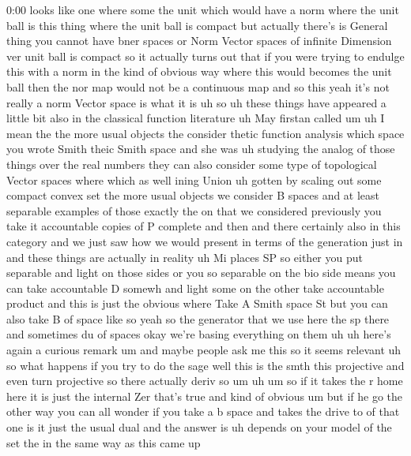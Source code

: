 \begin{unfinished}{0:00}
looks  like  one  where  some  the  unit  which
would  have  a  norm  where  the  unit  ball  is
this  thing  where  the  unit  ball  is
compact  but  actually  there's  is  General
thing  you  cannot  have  bner  spaces  or
Norm  Vector  spaces  of  infinite  Dimension
ver  unit  ball  is  compact  so  it  actually
turns  out  that  if  you  were  trying  to
endulge  this  with  a  norm  in  the  kind  of
obvious  way  where  this  would  becomes  the
unit  ball  then  the  nor  map  would  not  be
a  continuous  map
and  so
this  yeah  it's  not  really  a  norm  Vector
space  is  what  it  is
uh  so  uh  these  things  have  appeared  a
little  bit  also  in  the  classical
function  literature  uh  May
firstan
called  um
uh  I  mean  the  the  more  usual  objects  the
consider  thetic  function
analysis  which  space  you  wrote
Smith  theic  Smith
space  and  she  was  uh  studying  the  analog
of  those  things  over  the  real
numbers  they  can  also  consider  some  type
of  topological  Vector  spaces  where  which
as  well  ining  Union  uh  gotten  by  scaling
out  some  compact  convex
set  the  more  usual  objects  we  consider  B
spaces  and  at  least  separable  examples
of  those  exactly  the  on  that  we
considered  previously  you  take  it
accountable  copies  of  P  complete  and
then
and  there  certainly  also  in  this
category  and  we  just  saw  how  we  would
present  in  terms  of  the
generation
just
in
and  these  things  are  actually  in
reality
uh  Mi
places
SP  so  either  you  put  separable  and  light
on  those  sides  or
you  so  separable  on  the  bio  side  means
you  can  take  accountable  D  somewh  and
light  some  on  the  other  take  accountable
product  and  this  is  just  the  obvious
where  Take  A  Smith  space
St  but  you  can  also  take  B  of  space
like  so  yeah  so  the  generator  that  we
use  here  the  sp  there  and  sometimes  du
of  spaces  okay  we're  basing  everything
on
them
uh  uh  here's  again  a  curious  remark
um  and  maybe  people  ask  me  this  so  it
seems  relevant  uh  so  what  happens  if  you
try  to  do  the  sage  well  this  is  the  smth
this  projective  and  even  turn  projective
so  there  actually  deriv  so  um
uh
um  so  if  it  takes  the  r  home  here  it  is
just  the
internal
Zer  that's  true  and  kind  of  obvious  um
but  if  he  go  the  other  way  you  can  all
wonder  if  you  take  a  b  space  and  takes
the  drive  to  of  that  one
is  it  just  the  usual
dual  and  the  answer  is  uh  depends  on
your  model  of  the  set
the  in  the  same  way  as  this  came  up

\end{unfinished}

